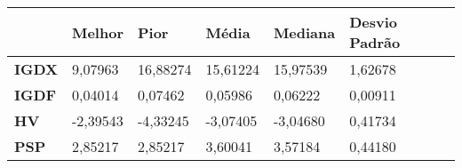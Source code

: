 \begin{table}[!ht]
    \centering
    \begin{tabular}{|l|l|l|l|l|l|}
    \hline
        \textbf{} & \textbf{Melhor} & \textbf{Pior} & \textbf{Média } & \textbf{Mediana } & \textbf{Desvio Padrão} \\ \hline
        \textbf{IGDX} & 9,07963 & 16,88274 & 15,61224 & 15,97539 & 1,62678 \\ \hline
        \textbf{IGDF} & 0,04014 & 0,07462 & 0,05986 & 0,06222 & 0,00911 \\ \hline
        \textbf{HV} & -2,39543 & -4,33245 & -3,07405 & -3,04680 & 0,41734 \\ \hline
        \textbf{PSP} & 2,85217 & 2,85217 & 3,60041 & 3,57184 & 0,44180 \\ \hline
    \end{tabular}
    \label{Tabela Métricas 1000 interações}
\end{table}